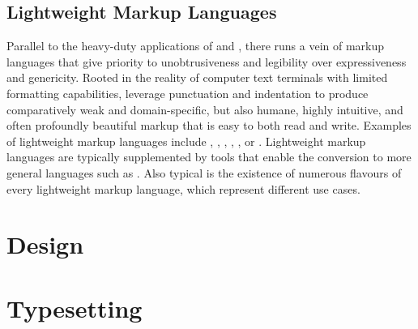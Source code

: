 \documentclass{book}
\begin{document}
\section{Lightweight Markup Languages}
Parallel to the heavy-duty applications of  and ,
there runs a vein of markup languages that give priority to unobtrusiveness and
legibility over expressiveness and genericity. Rooted in the reality of
computer text terminals with limited formatting capabilities,   leverage punctuation and
indentation to produce comparatively weak and domain-specific, but also humane,
highly intuitive, and often profoundly beautiful markup that is easy to both
read and write. Examples of lightweight markup languages include ,
, , , , or .
Lightweight markup languages are typically supplemented by tools that enable
the conversion to more general languages such as . Also typical
is the existence of numerous flavours of every lightweight markup language,
which represent different use cases.

\chapter{Design}
\chapter{Typesetting}
%
\end{document}
